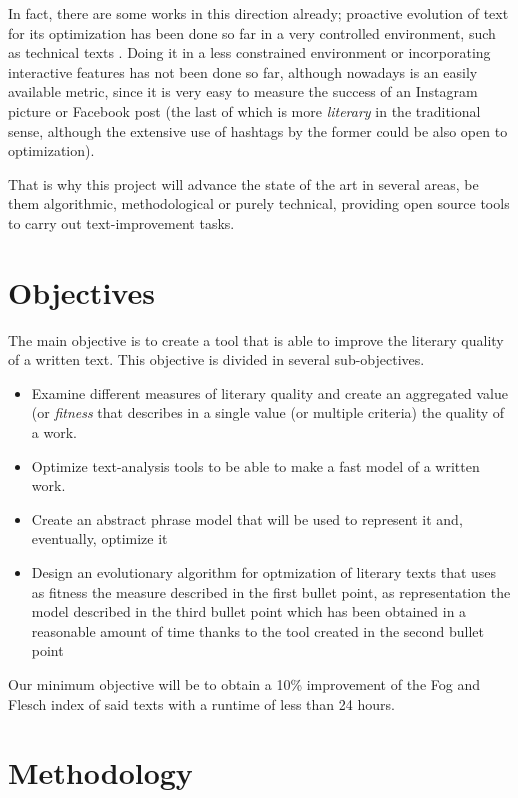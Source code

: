 \documentclass[a4paper,12pt,twocolumn]{article}
\begin{document}
In fact, there are some works in this direction already; proactive evolution of text for its optimization has been done so far
in a very controlled environment, such as technical texts
\cite{Rascu06acontrolled,hernandez2004checking}. Doing it in a less
constrained environment or incorporating interactive features
has not been done so far, although nowadays is an easily available
metric, since it is very easy to measure the success of an Instagram
picture or Facebook post (the last of which is more {\em literary} in
the traditional sense, although the extensive use of hashtags by the
former could be also open to optimization). 

That is why this project will advance the state of the art in several
areas, be them algorithmic, methodological or purely technical,
providing open source tools to carry out text-improvement tasks. 

\section{Objectives}
\label{sec:obj}

The main objective is to create a tool that is able to improve the literary
quality of a written text. This objective is divided in several
sub-objectives. \begin{itemize}
\item Examine different measures of literary quality and create an
  aggregated value (or {\em fitness} that describes in a single value
  (or multiple criteria) the quality of a work.
\item Optimize text-analysis tools to be able to make a fast model of
  a written work.
\item Create an abstract phrase model that will be used to represent
  it and, eventually, optimize it
\item Design an evolutionary algorithm for optmization of literary
  texts that uses as fitness the measure described in the first bullet
  point, as representation the model described in the third bullet
  point which has been obtained in a reasonable amount of time thanks
  to the tool created in the second bullet point
\end{itemize}

Our minimum objective will be to obtain a 10\% improvement of the Fog and Flesch index of said
  texts with a runtime of less than 24 hours. 

\section{Methodology}
\label{sec:meth}
\end{document}
